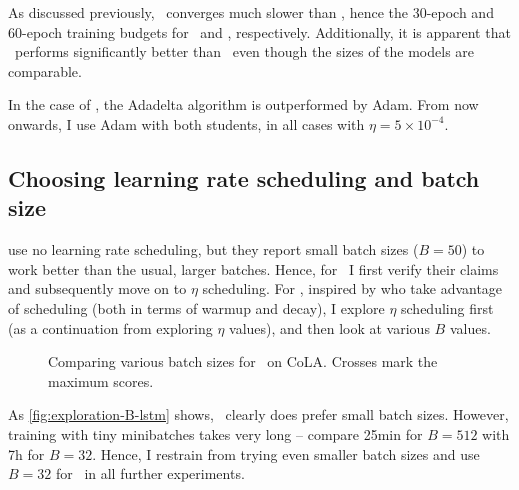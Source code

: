 {{    As discussed previously, \BERTS~converges much slower than \LSTMS, hence the 30-epoch and 60-epoch training budgets for \LSTMS~and \BERTS, respectively. Additionally, it is apparent that \LSTMS~performs significantly better than \BERTS~even though the sizes of the models are comparable.

    In the case of \LSTMS, the Adadelta algorithm is outperformed by Adam. From now onwards, I use Adam with both students, in all cases with $\eta=5\times10^{-4}$.
  }

  \subsection{Choosing learning rate scheduling and batch size}{
    \citet{Tang_2019a} use no learning rate scheduling, but they report small batch sizes ($B=50$) to work better than the usual, larger batches. Hence, for \LSTMS~I first verify their claims and subsequently move on to $\eta$ scheduling. For \BERTS, inspired by \citet{Sanh_2019} who take advantage of scheduling (both in terms of warmup and decay), I explore $\eta$ scheduling first (as a continuation from exploring $\eta$ values), and then look at various $B$ values.

    \begin{figure}[h!t]
      \centering
      \caption{Comparing various batch sizes for \LSTMS~on CoLA. Crosses mark the maximum scores. \sliding}
      \label{fig:exploration-B-lstm}
    \end{figure}

    As \autoref{fig:exploration-B-lstm} shows, \LSTMS~clearly does prefer small batch sizes. However, training with tiny minibatches takes very long -- compare \mytilde25min for $B=512$ with \mytilde7h for $B=32$. Hence, I restrain from trying even smaller batch sizes and use $B=32$ for \LSTMS~in all further experiments.

}}
